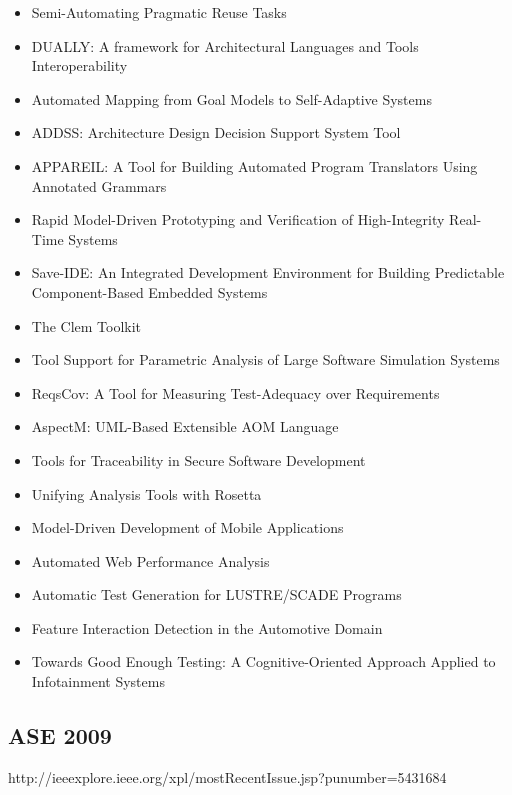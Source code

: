 {\begin{itemize}[itemsep=-1ex]
  \item Semi-Automating Pragmatic Reuse Tasks
  \item DUALLY: A framework for Architectural Languages and Tools Interoperability
  \item Automated Mapping from Goal Models to Self-Adaptive Systems
  \item ADDSS: Architecture Design Decision Support System Tool
  \item APPAREIL: A Tool for Building Automated Program Translators Using Annotated Grammars
  \item Rapid Model-Driven Prototyping and Verification of High-Integrity Real-Time Systems
  \item Save-IDE: An Integrated Development Environment for Building Predictable Component-Based Embedded Systems
  \item The Clem Toolkit
  \item Tool Support for Parametric Analysis of Large Software Simulation Systems
  \item ReqsCov: A Tool for Measuring Test-Adequacy over Requirements
  \item AspectM: UML-Based Extensible AOM Language
  \item Tools for Traceability in Secure Software Development
  \item Unifying Analysis Tools with Rosetta
  \item Model-Driven Development of Mobile Applications
  \item Automated Web Performance Analysis
  \item Automatic Test Generation for LUSTRE/SCADE Programs
  \item Feature Interaction Detection in the Automotive Domain
  \item Towards Good Enough Testing: A Cognitive-Oriented Approach Applied to Infotainment Systems
\end{itemize}
}

\subsection{ASE 2009}

http://ieeexplore.ieee.org/xpl/mostRecentIssue.jsp?punumber=5431684

